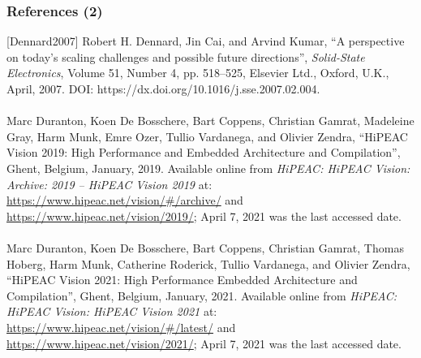 \documentclass[xcolor={usenames,dvipsnames},hyperref={hyperindex,bookmarks}]{beamer}
\begin{document}
\begin{frame}
	\frametitle{References (2)}

	[Dennard2007] Robert H. Dennard, Jin Cai, and Arvind Kumar, ``A perspective on today's scaling challenges and possible future directions'', {\it Solid-State Electronics}, Volume 51, Number 4, pp. 518--525, Elsevier Ltd., Oxford, {U.K.}, April, 2007. DOI: https://dx.doi.org/10.1016/j.sse.2007.02.004. \\
	\ \\
	[Duranton2019] Marc Duranton, Koen {De Bosschere}, Bart Coppens, Christian Gamrat, Madeleine Gray, Harm Munk, Emre Ozer, Tullio Vardanega, and Olivier Zendra, ``{HiPEAC} Vision 2019: High Performance and Embedded Architecture and Compilation'', Ghent, Belgium, January, 2019. Available online from {\it {HiPEAC}: {HiPEAC} Vision: Archive: 2019 -- {HiPEAC} Vision 2019} at: \url{https://www.hipeac.net/vision/#/archive/} and \url{https://www.hipeac.net/vision/2019/}; April 7, 2021 was the last accessed date. \\
	\ \\
	[Duranton2021] Marc Duranton, Koen {De Bosschere}, Bart Coppens, Christian Gamrat, Thomas Hoberg, Harm Munk, Catherine Roderick, Tullio Vardanega, and Olivier Zendra, ``{HiPEAC} Vision 2021: High Performance Embedded Architecture and Compilation'', Ghent, Belgium, January, 2021. Available online from {\it {HiPEAC}: {HiPEAC} Vision: {HiPEAC} Vision 2021} at: \url{https://www.hipeac.net/vision/#/latest/} and \url{https://www.hipeac.net/vision/2021/}; April 7, 2021 was the last accessed date.

\end{frame}
\end{document}
